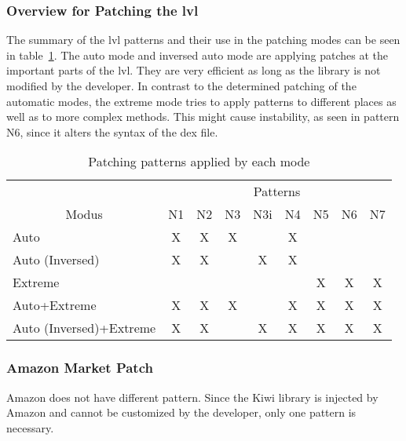 \subsubsection{Overview for Patching the \gls{lvl}}
The summary of the \gls{lvl} patterns and their use in the patching modes can be seen in table~\ref{table:patterns}.
The auto mode and inversed auto mode are applying patches at the important parts of the \gls{lvl}.
They are very efficient as long as the library is not modified by the developer.
\newline
In contrast to the determined patching of the automatic modes, the extreme mode tries to apply patterns to different places as well as to more complex methods.
This might cause instability, as seen in pattern N6, since it alters the syntax of the dex file.
\begin{table}[h]
\centering
\begin{tabular}{l|cccccccc}
                           & \multicolumn{8}{c}{Patterns}           \\
\multicolumn{1}{c|}{Modus} & N1 & N2 & N3 & N3i & N4 & N5 & N6 & N7 \\ \hline
Auto                       & X  & X  & X  &     & X  &    &    &    \\
Auto (Inversed)            & X  & X  &    & X   & X  &    &    &    \\
Extreme                    &    &    &    &     &    & X  & X  & X  \\
Auto+Extreme               & X  & X  & X  &     & X  & X  & X  & X  \\
Auto (Inversed)+Extreme    & X  & X  &    & X   & X  & X  & X  & X
\end{tabular}
\caption{Patching patterns applied by each mode}
\label{table:patterns}
\end{table}


\subsubsection{Amazon Market Patch}
Amazon does not have different pattern.
Since the Kiwi library is injected by Amazon and cannot be customized by the developer, only one pattern is necessary.

